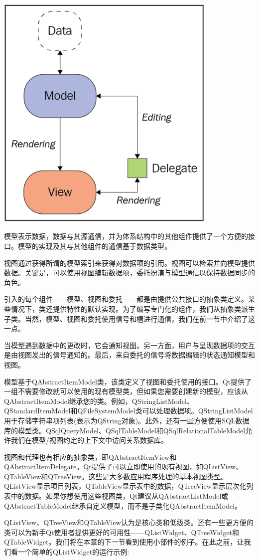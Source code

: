 \begin{center}
	\includegraphics[width=0.8\textwidth]{content/Section-2/Chapter-14/9}
\end{center}

模型表示数据，数据与其源通信，并为体系结构中的其他组件提供了一个方便的接口。模型的实现及其与其他组件的通信基于数据类型。 \par
视图通过获得所谓的模型索引来获得对数据项的引用。视图可以检索并向模型提供数据。关键是，可以使用视图编辑数据项，委托扮演与模型通信以保持数据同步的角色。 \par
引入的每个组件——模型、视图和委托——都是由提供公共接口的抽象类定义。某些情况下，类还提供特性的默认实现。为了编写专门化的组件，我们从抽象类派生子类。当然，模型、视图和委托使用信号和槽进行通信，我们在前一节中介绍了这一点。 \par
当模型遇到数据中的更改时，它会通知视图。另一方面，用户与呈现数据项的交互是由视图发出的信号通知的。最后，来自委托的信号将数据编辑的状态通知模型和视图。 \par
模型基于QAbstractItemModel类，该类定义了视图和委托使用的接口。Qt提供了一组不需要修改就可以使用的现有模型类，但如果您需要创建新的模型，应该从QAbstractItemModel继承您的类。例如，QStringListModel、QStandardItemModel和QFileSystemModel类可以处理数据项。QStringListModel用于存储字符串项列表(表示为QString对象)。此外，还有一些方便使用SQL数据库的模型类。QSqlQueryModel、QSqlTableModel和QSqlRelationalTableModel允许我们在模型/视图约定的上下文中访问关系数据库。 \par
视图和代理也有相应的抽象类，即QAbstractItemView和QAbstractItemDelegate。Qt提供了可以立即使用的现有视图，如QListView、QTableView和QTreeView。这些是大多数应用程序处理的基本视图类型。QListView显示项目列表，QTableView显示表中的数据，QTreeView显示层次化列表中的数据。如果你想使用这些视图类，Qt建议从QAbstractListModel或QAbstractTableModel继承自定义模型，而不是子类化QAbstractItemModel。 \par
QListView、QTreeView和QTableView认为是核心类和低级类。还有一些更方便的类可以为新手Qt使用者提供更好的可用性——QListWidget、QTreeWidget和QTableWidget。我们将在本章的下一节看到使用小部件的例子。在此之前，让我们看一个简单的QListWidget的运行示例: \par

